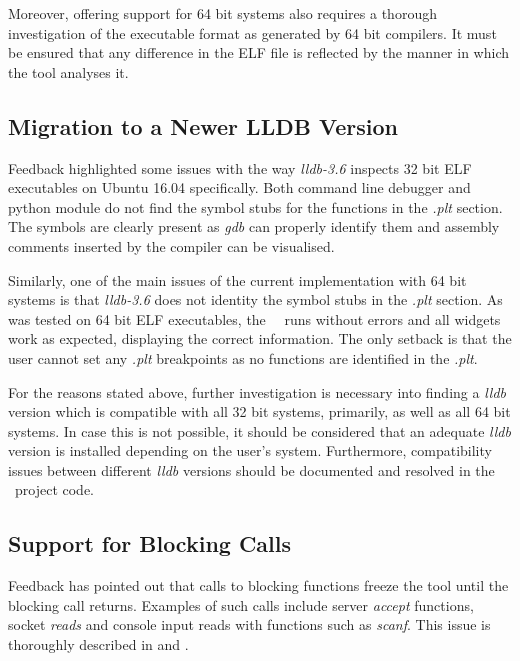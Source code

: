 Moreover, offering support for 64 bit systems also requires a thorough investigation of the executable format as generated by 64 bit compilers. It must be ensured that any difference in the ELF file is reflected by the manner in which the tool analyses it. 

\subsection{Migration to a Newer LLDB Version}
\label{sub-sec:lldb-version-further}

Feedback highlighted some issues with the way \textit{lldb-3.6} inspects 32 bit ELF executables on Ubuntu 16.04 specifically. Both command line debugger and python module do not find the symbol stubs for the functions in the \textit{.plt} section. The symbols are clearly present as \textit{gdb} can properly identify them and assembly comments inserted by the compiler can be visualised.

Similarly, one of the main issues of the current implementation with 64 bit systems is that \textit{lldb-3.6} does not identity the symbol stubs in the \textit{.plt} section. As was tested on 64 bit ELF executables, the \project\ \gui\ runs without errors and all widgets work as expected, displaying the correct information. The only setback is that the user cannot set any \textit{.plt} breakpoints as no functions are identified in the \textit{.plt}.

For the reasons stated above, further investigation is necessary into finding a \textit{lldb} version which is compatible with all 32 bit systems, primarily, as well as all 64 bit systems. In case this is not possible, it should be considered that an adequate \textit{lldb} version is installed depending on the user's system. Furthermore, compatibility issues between different \textit{lldb} versions should be documented and resolved in the \project\ project code.

\subsection{Support for Blocking Calls}
\label{sub-sec:blocking-further}

Feedback has pointed out that calls to blocking functions freeze the tool until the blocking call returns. Examples of such calls include server \textit{accept} functions, socket \textit{reads} and console input reads with functions such as \textit{scanf}. This issue is thoroughly described in  and . 

